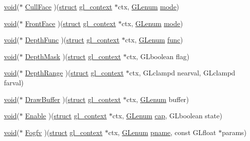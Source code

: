 \begin{Indent}
\begin{DoxyCompactItemize}
\item 
\hyperlink{interfacevoid}{void}($\ast$ \hyperlink{structdd__function__table_ab5de002676624683a137641cf9053901}{Cull\+Face} )(\hyperlink{interfacestruct}{struct} \hyperlink{structgl__context}{gl\+\_\+context} $\ast$ctx, \hyperlink{interfacevoid}{G\+Lenum} \hyperlink{interfacevoid}{mode})
\item 
\hyperlink{interfacevoid}{void}($\ast$ \hyperlink{structdd__function__table_a456ec268b948ec165002ec80537e4172}{Front\+Face} )(\hyperlink{interfacestruct}{struct} \hyperlink{structgl__context}{gl\+\_\+context} $\ast$ctx, \hyperlink{interfacevoid}{G\+Lenum} \hyperlink{interfacevoid}{mode})
\item 
\hyperlink{interfacevoid}{void}($\ast$ \hyperlink{structdd__function__table_a5a2b32e1e03a438e9b00236cf1771933}{Depth\+Func} )(\hyperlink{interfacestruct}{struct} \hyperlink{structgl__context}{gl\+\_\+context} $\ast$ctx, \hyperlink{interfacevoid}{G\+Lenum} \hyperlink{interfacevoid}{func})
\item 
\hyperlink{interfacevoid}{void}($\ast$ \hyperlink{structdd__function__table_aee0bc3435fdd8129e7e7d8d38e4a80bf}{Depth\+Mask} )(\hyperlink{interfacestruct}{struct} \hyperlink{structgl__context}{gl\+\_\+context} $\ast$ctx, G\+Lboolean flag)
\item 
\hyperlink{interfacevoid}{void}($\ast$ \hyperlink{structdd__function__table_affca6014f4ce79ba995be2521bedaf24}{Depth\+Range} )(\hyperlink{interfacestruct}{struct} \hyperlink{structgl__context}{gl\+\_\+context} $\ast$ctx, G\+Lclampd nearval, G\+Lclampd farval)
\item 
\hyperlink{interfacevoid}{void}($\ast$ \hyperlink{structdd__function__table_abb75f45b604b66c6e6cf986383f17c1b}{Draw\+Buffer} )(\hyperlink{interfacestruct}{struct} \hyperlink{structgl__context}{gl\+\_\+context} $\ast$ctx, \hyperlink{interfacevoid}{G\+Lenum} buffer)
\item 
\hyperlink{interfacevoid}{void}($\ast$ \hyperlink{structdd__function__table_ae22e641c2c7458248f00b64a289c2655}{Enable} )(\hyperlink{interfacestruct}{struct} \hyperlink{structgl__context}{gl\+\_\+context} $\ast$ctx, \hyperlink{interfacevoid}{G\+Lenum} \hyperlink{interfacevoid}{cap}, G\+Lboolean state)
\item 
\hyperlink{interfacevoid}{void}($\ast$ \hyperlink{structdd__function__table_a31cee9b3e736221e5f7dd13c09ecf155}{Fogfv} )(\hyperlink{interfacestruct}{struct} \hyperlink{structgl__context}{gl\+\_\+context} $\ast$ctx, \hyperlink{interfacevoid}{G\+Lenum} \hyperlink{interfacevoid}{pname}, const G\+Lfloat $\ast$params)

\end{DoxyCompactItemize}
\end{Indent}
